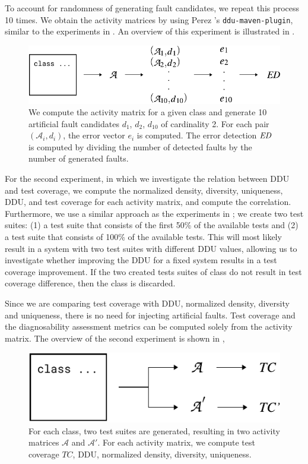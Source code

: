 \documentclass[twoside,a4paper,11pt]{memoir}
\begin{document}
To account for randomness of generating fault candidates, we repeat this process 10 times.
We obtain the activity matrices by using Perez \etal's \texttt{ddu-maven-plugin}, similar to the experiments in .
An overview of this experiment is illustrated in .
\begin{figure}[b]
  \includegraphics[width=\linewidth]{figures/error_detection}
  \caption{We compute the activity matrix for a given class and generate 10 artificial fault candidates \(d_1 \), \(d_2 \), \(d_{10}\) of cardinality 2. For each pair \((\mathcal{A}_i, d_i) \), the error vector \(e_i \) is computed. The error detection \(\emph{ED}\) is computed by dividing the number of detected faults by the number of generated faults.}%
  \label{fig:error_detection_computation}
\end{figure}

For the second experiment, in which we investigate the relation between DDU and test coverage, we compute the normalized density, diversity, uniqueness, DDU, and test coverage for each activity matrix, and compute the correlation.
Furthermore, we use a similar approach as the experiments in ; we create two test suites: (1) a test suite that consists of the first 50\% of the available tests and (2) a test suite that consists of 100\% of the available tests.
This will most likely result in a system with two test suites with different DDU values, allowing us to investigate whether improving the DDU for a fixed system results in a test coverage improvement.
If the two created tests suites of class do not result in test coverage difference, then the class is discarded.

Since we are comparing test coverage with DDU, normalized density, diversity and uniqueness, there is no need for injecting artificial faults.
Test coverage and the diagnosability assessment metrics can be computed solely from the activity matrix.
The overview of the second experiment is shown in ,
\begin{figure}
  \center%
  \includegraphics[width=0.6\linewidth]{figures/delta_test_coverage_approach}
  \caption{For each class, two test suites are generated, resulting in two activity matrices \(\mathcal{A} \) and \(\mathcal{A}' \). For each activity matrix, we compute test coverage \(TC \), DDU, normalized density, diversity, uniqueness.}%
  \label{fig:delta_test_coverage_approach}
\end{figure}
\end{document}
